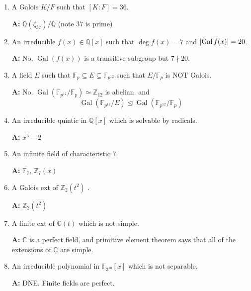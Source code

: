 \documentclass[notoc,notitlepage,nobib]{tufte-book}
\DeclareMathOperator{\Gal}{Gal}
\begin{document}
\begin{enumerate}
  \item A Galois $K / F$ such that $[K : F] = 36$.
    
    \textbf{A:} $\mathbb{Q}(\zeta_{37}) / \mathbb{Q}$ (note 37 is prime)

  \item An irreducible $f(x) \in \mathbb{Q}[x]$ such that $\deg f(x) = 7$ and
    $\abs{\Gal f(x)} = 20$.

    \textbf{A:} No, $\Gal(f(x))$ is a transitive subgroup but $7 \nmid 20$.

  \item A field  $E$ such that $\mathbb{F}_p \subseteq E \subseteq
    \mathbb{F}_{p^{12}}$ such that $E / \mathbb{F}_p$ is NOT Galois.

    \textbf{A:} No. $\Gal( \mathbb{F}_{p^{12}} / \mathbb{F}_p )
    \simeq \mathbb{Z}_{12}$ is abelian. and
    \begin{equation*}
      \Gal( \mathbb{F}_{p^{12}} / E ) \trianglelefteq \Gal( \mathbb{F}_{p^{12}}
      / \mathbb{F}_p)
    \end{equation*}

  \item An irreducible quintic in $\mathbb{Q}[x]$ which is solvable by radicals.

    \textbf{A:} $x^5 - 2$

  \item An infinite field of characteristic $7$.

    \textbf{A:} $\overline{\mathbb{F}_7}, \, \mathbb{Z}_7(x)$

  \item A Galois ext of $\mathbb{Z}_2(t^2)$ .

    \textbf{A:} $\mathbb{Z}_2(t^2)$

  \item A finite ext of $\mathbb{C}(t)$ which is not simple.

    \textbf{A:} $\mathbb{C}$ is a perfect field, and primitive element theorem
    says that all of the extensions of $\mathbb{C}$ are simple.

  \item An irreducible polynomial in $\mathbb{F}_{3^{10}}[x]$ which is not
    separable.

    \textbf{A:} DNE. Finite fields are perfect.
\end{enumerate}


\end{document}
